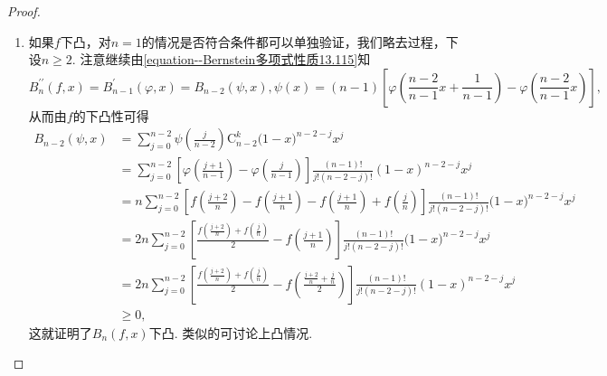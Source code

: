\documentclass[../../main.tex]{subfiles}
\begin{document}
\begin{proof}
\begin{enumerate}[(1)]
\item 如果\(f\)下凸，对\(n = 1\)的情况是否符合条件都可以单独验证，我们略去过程，下设\(n\geqslant2\). 注意继续由\eqref{equation--Bernstein多项式性质13.115}知
\[B_n^{\prime\prime}(f,x)=B_{n - 1}^\prime(\varphi,x)=B_{n - 2}(\psi,x),\psi(x)=(n - 1)\left[\varphi\left(\frac{n - 2}{n-1}x+\frac{1}{n-1}\right)-\varphi\left(\frac{n - 2}{n-1}x\right)\right],\]
从而由$f$的下凸性可得
\begin{align*}
B_{n - 2}(\psi,x)&=\sum_{j=0}^{n-2}{\psi \left( \frac{j}{n-2} \right) \mathrm{C}_{n-2}^{k}(1}-x)^{n-2-j}x^j
\\
&=\sum_{j = 0}^{n - 2}\left[\varphi\left(\frac{j + 1}{n - 1}\right)-\varphi\left(\frac{j}{n - 1}\right)\right]\frac{(n - 1)!}{j!(n - 2 - j)!}(1 - x)^{n - 2 - j}x^j
\\
&=n\sum_{j=0}^{n-2}{\left[ f\left( \frac{j+2}{n} \right) -f\left( \frac{j+1}{n} \right) -f\left( \frac{j+1}{n} \right) +f\left( \frac{j}{n} \right) \right] \frac{(n-1)!}{j!(n-2-j)!}(1}-x)^{n-2-j}x^j
\\
&=2n\sum_{j=0}^{n-2}{\left[ \frac{f\left( \frac{j+2}{n} \right) +f\left( \frac{j}{n} \right)}{2}-f\left( \frac{j+1}{n} \right) \right] \frac{(n-1)!}{j!(n-2-j)!}(1}-x)^{n-2-j}x^j
\\
&=2n\sum_{j = 0}^{n - 2}\left[\frac{f\left(\frac{j + 2}{n}\right)+f\left(\frac{j}{n}\right)}{2}-f\left(\frac{\frac{j + 2}{n}+\frac{j}{n}}{2}\right)\right]\frac{(n - 1)!}{j!(n - 2 - j)!}(1 - x)^{n - 2 - j}x^j
\\
&\geqslant0,
\end{align*}
这就证明了\(B_n(f,x)\)下凸. 类似的可讨论上凸情况.


\end{enumerate}
\end{proof}
\end{document}
